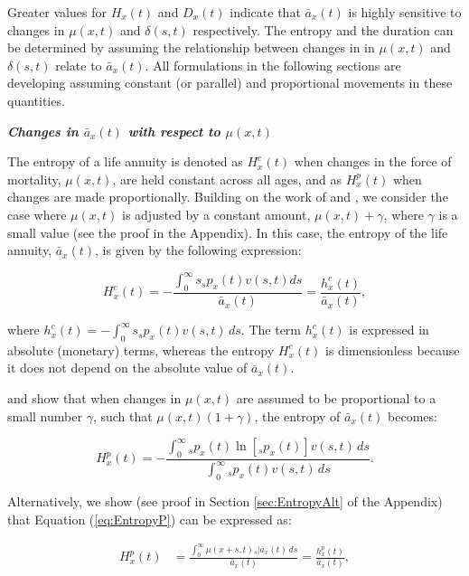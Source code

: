 \documentclass[12pt]{article}
\begin{document}
Greater values for ${H}_{x}(t)$ and ${D}_{x}(t)$ indicate that $\bar{a}_x(t)$ is highly sensitive to changes in $\mu(x,t)$ and $\delta(s,t)$ respectively. The entropy and the duration can be determined by assuming the relationship between changes in in $\mu(x,t)$ and $\delta(s,t)$ relate to $\bar{a}_x(t)$. All formulations in the following sections are developing assuming constant (or parallel) and proportional movements in these quantities.

\textit{\textbf{{Changes in $\bar{a}_x(t)$ with respect to $\mu(x,t)$}}}


The entropy of a life annuity is denoted as ${H}^{c}_{x}(t)$ when changes in the force of mortality, $\mu(x,t)$, are held constant across all ages, and as ${H}^{p}_{x}(t)$ when changes are made proportionally. Building on the work of \citet{Tsai2013a} and \citet{Lin2020}, we consider the case where $\mu(x,t)$ is adjusted by a constant amount, $\mu(x,t) + \gamma$, where $\gamma$ is a small value (see the proof in the Appendix). In this case, the entropy of the life annuity, $\bar{a}_x(t)$, is given by the following expression:


\begin{equation}\label{eq:EntropyC}
{H}^{c}_{x}(t) = -\frac{\int_{0}^\infty s {}_sp_x(t) {v}(s,t) ds}{\bar{a}_x(t)}=\frac{{h}^{c}_{x}(t)}{\bar{a}_x(t)},
\end{equation}

where ${h}^{c}_{x}(t)=-\int_{0}^\infty s {}_s p_x(t) {v}(s,t) \, ds$. The term ${h}^{c}_{x}(t)$ is expressed in absolute (monetary) terms, whereas the entropy ${H}^{c}_{x}(t)$ is dimensionless because it does not depend on the absolute value of $\bar{a}_x(t)$.

\citet{Haberman2011} and \citet{Tsai2013a} show that when changes in $\mu(x,t)$ are assumed to be proportional to a small number $\gamma$, such that $\mu(x,t)(1+\gamma)$, the entropy of $\bar{a}_x(t)$ becomes:

\begin{equation} \label{eq:EntropyP}
	{H}^{p}_{x}(t) = -\frac{ \int_{0}^{\infty}{}_s p_x(t)\ln\left[{}_s p_x(t)\right] {v}(s,t) \, ds}{\int_0^\infty {}_s p_x(t) {v}(s,t) \, ds}.
\end{equation}

Alternatively, we show (see proof in Section \ref{sec:EntropyAlt} of the Appendix) that Equation (\ref{eq:EntropyP}) can be expressed as:

\begin{equation} \label{eq:EntropyP2}
	\begin{split}
		{H}^{p}_{x}(t) &=  \frac{\int_0^\infty \mu(x+s,t)   {}_s|\bar{a}_x(t) \, ds}{\bar{a}_x(t)} =  \frac{{h}^{p}_{x}(t)}{\bar{a}_x(t)}, 
	\end{split}
\end{equation}
\end{document}

